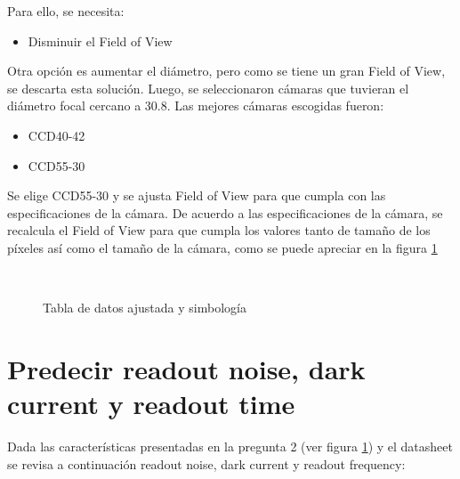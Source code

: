 \documentclass[a4paper,10pt]{article}
\begin{document}
Para ello, se necesita:
\begin{itemize}
\item Disminuir el Field of View
\end{itemize}

Otra opción es aumentar el diámetro, pero como se tiene un gran Field of
View, se descarta esta solución. Luego, se seleccionaron cámaras que
tuvieran el diámetro focal cercano a 30.8. Las mejores cámaras escogidas
fueron:
\begin{itemize}
\item CCD40-42
\item CCD55-30
\end{itemize}

Se elige CCD55-30 y se ajusta Field of View para que cumpla con las
especificaciones de la cámara. De acuerdo a las especificaciones de la cámara,
se recalcula el Field of View para que cumpla los valores tanto de tamaño de los píxeles así
como el tamaño de la cámara, como se puede apreciar en la figura \ref{fig:p2}
\begin{figure}[ht!]
  \centering
  ~ 
  ~ 
  \caption{Tabla de datos ajustada y simbología}
  \label{fig:p2}
\end{figure}

\section{Predecir readout noise, dark current y readout time}
Dada las características presentadas en la pregunta 2 (ver figura \ref{fig:p2})
y el datasheet se revisa a continuación readout noise, dark current y readout
frequency:
\end{document}
